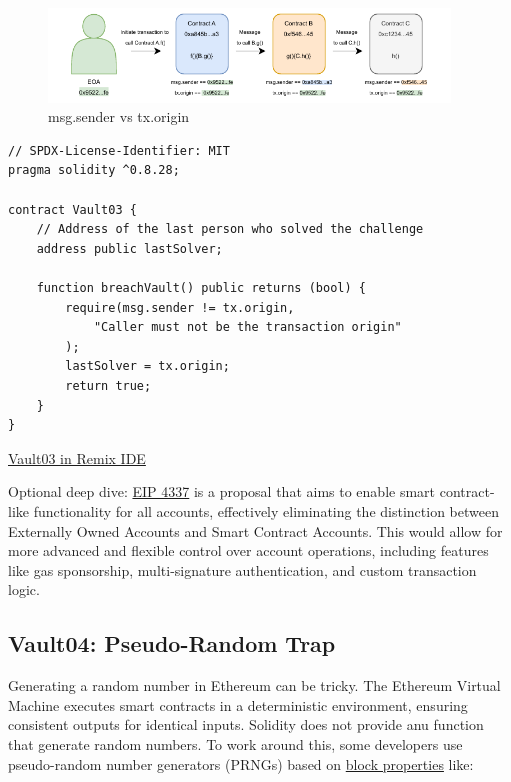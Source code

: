 \documentclass[12pt]{article}
\begin{document}
\begin{figure}[h!]
  \centering
  \includegraphics[width=0.95\textwidth]{msg.sender.pdf}
  \caption{msg.sender vs tx.origin}
  \label{fig:msg.sender}
\end{figure}

\begin{lstlisting}[language=Solidity]
// SPDX-License-Identifier: MIT
pragma solidity ^0.8.28;

contract Vault03 {
    // Address of the last person who solved the challenge
    address public lastSolver;

    function breachVault() public returns (bool) {
        require(msg.sender != tx.origin,
            "Caller must not be the transaction origin"
        );
        lastSolver = tx.origin;
        return true;
    }
}
\end{lstlisting}

\medskip
\noindent
\href{https://remix.ethereum.org/?#activate=solidity&url=https://github.com/radovluk/unbreakable-vault/contracts/Vault03.sol&lang=en&optimize=false&runs=200&evmVersion=null&version=soljson-v0.8.28+commit.7893614a.js}{Vault03 in Remix IDE}

\medskip
\noindent
Optional deep dive:
\href{https://eips.ethereum.org/EIPS/eip-4337}{EIP 4337} is a proposal that aims to enable smart contract-like functionality for all accounts, effectively eliminating the distinction between Externally Owned Accounts and Smart Contract Accounts. This would allow for more advanced and flexible control over account operations, including features like gas sponsorship, multi-signature authentication, and custom transaction logic.

\subsection*{Vault04: Pseudo-Random Trap}

Generating a random number in Ethereum can be tricky. The Ethereum Virtual Machine executes smart contracts in a deterministic environment, ensuring consistent outputs for identical inputs. Solidity does not provide anu function that generate random numbers. To work around this, some developers use pseudo-random number generators (PRNGs) based on \href{https://docs.soliditylang.org/en/latest/cheatsheet.html\#block-and-transaction-properties}{block properties} like:
\end{document}
